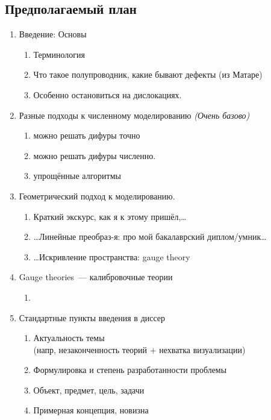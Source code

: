 \documentclass[a4paper, 14pt, titlepage]{extarticle}
\begin{document}

    \clearpage
    \tableofcontents


  \subsection{Предполагаемый план}

  \begin{enumerate}
    \item Введение: Основы
      \begin{enumerate}
        \item Терминология \label{enu:terms}
        \item Что такое полупроводник, какие бывают дефекты (из Матаре) \label{enu:semicond}
        \item Особенно остановиться на дислокациях.
      \end{enumerate}
    \item Разные подходы к численному моделированию \emph{(Очень базово)}
      \begin{enumerate}
        \item можно решать дифуры точно
        \item можно решать дифуры численно. \label{enu:numeric}
        \item упрощённые алгоритмы          \label{enu:simple}
      \end{enumerate}
    \item Геометрический подход к моделированию.
      \begin{enumerate}
        \item Краткий экскурс, как я к этому пришёл,\dots
        \item \dots Линейные преобраз-я: про мой бакалаврский диплом/умник\dots
        \item \dots Искривление пространства: gauge theory
      \end{enumerate}
    \item Gauge theories~--- калибровочные теории \label{enu:gauge}
      \begin{enumerate}
        \item {}
      \end{enumerate}
    \item Стандартные пункты введения в диссер
      \begin{enumerate}
        \item Актуальность темы\\ (напр, незаконченность теорий + нехватка визуализации)
        \item Формулировка и степень разработанности проблемы
        \item Объект, предмет, цель, задачи
        \item Примерная концепция, новизна
      \end{enumerate}
  \end{enumerate}
\end{document}
